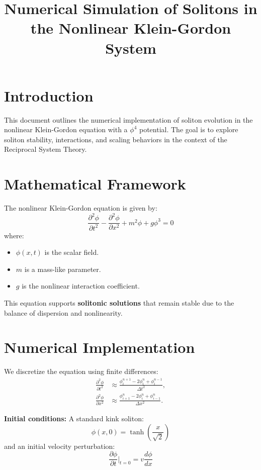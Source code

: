 \documentclass{article}
\title{Numerical Simulation of Solitons in the Nonlinear Klein-Gordon System}
\author{}
\date{}
\begin{document}
\maketitle

\section{Introduction}
This document outlines the numerical implementation of soliton evolution in the nonlinear Klein-Gordon equation with a $\phi^4$ potential. The goal is to explore soliton stability, interactions, and scaling behaviors in the context of the Reciprocal System Theory.

\section{Mathematical Framework}
The nonlinear Klein-Gordon equation is given by:
\begin{equation}
\frac{\partial^2 \phi}{\partial t^2} - \frac{\partial^2 \phi}{\partial x^2} + m^2 \phi + g \phi^3 = 0
\end{equation}
where:
\begin{itemize}
    \item $\phi(x,t)$ is the scalar field.
    \item $m$ is a mass-like parameter.
    \item $g$ is the nonlinear interaction coefficient.
\end{itemize}

This equation supports \textbf{solitonic solutions} that remain stable due to the balance of dispersion and nonlinearity.

\section{Numerical Implementation}
We discretize the equation using finite differences:
\begin{align}
  \frac{\partial^2 \phi}{\partial t^2} &\approx \frac{\phi^{n+1}_i - 2\phi^n_i + \phi^{n-1}_i}{\Delta t^2}, \\
  \frac{\partial^2 \phi}{\partial x^2} &\approx \frac{\phi^n_{i+1} - 2\phi^n_i + \phi^n_{i-1}}{\Delta x^2}.
\end{align}

\textbf{Initial conditions:}
A standard kink soliton:
\begin{equation}
\phi(x, 0) = \tanh\left(\frac{x}{\sqrt{2}}\right)
\end{equation}
and an initial velocity perturbation:
\begin{equation}
\frac{\partial \phi}{\partial t} \bigg|_{t=0} = v \frac{d\phi}{dx}
\end{equation}
\end{document}
